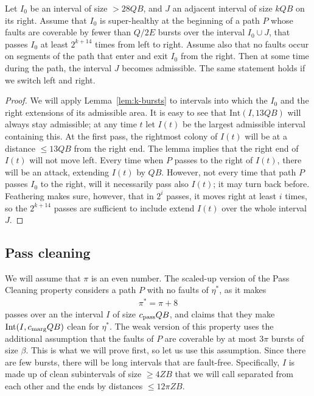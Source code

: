 \documentclass[11pt]{memoir}
\theoremstyle{definition} %
\renewcommand{\le}{\leq}
\renewcommand{\ge}{\geq}
\def\B{B}
\newcommand{\E}{E} %
\newcommand{\Int}{\mathrm{Int}} %
\newcommand{\passno}{\pi}
\newcommand{\Q}{Q} %
\newcommand{\Z}{Z} %
\newcommand{\cns}[1]{c_{\textrm{\upshape #1}}}
\newcommand{\CMarg}{\cns{marg}}
\newcommand{\CPass}{\cns{pass}}
\begin{document}
  \begin{lemma}\label{lem:weak-repeated-attack}
  Let \( I_{0} \) be an interval of size \( > 28\Q\B \), and \( J \) an adjacent
  interval of size \( k\Q\B \) on its right.
  Assume that \( I_{0} \) is super-healthy at the beginning of a path \( P \) whose
  faults are coverable by fewer
  than \( \Q/2\E \) bursts over the interval  \( I_{0}\cup J \), that passes \( I_{0} \)
  at least \( 2^{k+14} \) times from left to right.
  Assume also that no faults occur on segments of the path that enter and exit \( I_{0} \) from the right.
  Then at some time during the path, the interval \( J \) becomes admissible.
  The same statement holds if we switch left and right.
\end{lemma}
\begin{proof}
  We will apply Lemma~\ref{lem:k-bursts} to intervals into which the \( I_{0} \) and the
  right extensions of its admissible area.
  It is easy to see that \( \Int(I,13\Q\B) \) will always stay admissible; at any time \( t \)
  let \( I(t) \) be the largest admissible interval containing this.
  At the first pass, the rightmost colony of \( I(t) \) will be at a distance \( \le 13\Q\B \) from the right end.
  The lemma implies that the right end of \( I(t) \) will not move left.
  Every time when \( P \) passes to the right of \( I(t) \), there will be an attack, extending \( I(t) \) by \( \Q\B \).
  However, not every time that path \( P \) passes \( I_{0} \) to the right, will it necessarily pass
  also \( I(t) \); it may turn back before.
  Feathering makes sure, however, that in \( 2^{i} \) passes, it moves right at least \( i \) times,
  so the \( 2^{k+14} \) passes are sufficient to include extend \( I(t) \) over the whole interval \( J \).
  \end{proof}


\subsection{Pass cleaning}\label{sec:pass-cleaning}

\begin{sloppypar}
  We will assume that \( \passno \) is an even number.
The scaled-up version of the Pass Cleaning property
considers a path \( P \) with no faults of \( \eta^{*} \), as it makes
\begin{align}\label{eq:passno}
 \passno^{*}=\passno + 8
 \end{align}
 passes over an the interval \( I \) of size \( \CPass\Q\B \),
 and claims that they make \( \Int(I,\CMarg\Q\B) \) clean for \( \eta^{*} \).
 The weak version of this property uses the additional assumption that the faults of \( P \)
 are coverable by at most \( 3\passno \) bursts of size \( \beta \).
 This is what we will prove first, so let us use this assumption.
 Since there are few bursts, there will be long intervals that are fault-free.
 Specifically, \( I \) is made up of clean subintervals of size \( \ge 4\Z\B \) that we will call 
 separated from each other and the ends by distances \( \le 12\passno\Z\B \).
 \end{sloppypar}
 
\end{document}
